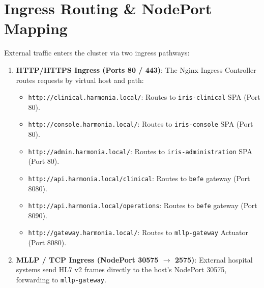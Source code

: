 \section{Ingress Routing \& NodePort Mapping}

External traffic enters the cluster via two ingress pathways:
\begin{enumerate}
    \item \textbf{HTTP/HTTPS Ingress (Ports 80 / 443)}: The Nginx Ingress Controller routes requests by virtual host and path:
    \begin{itemize}
        \item \texttt{http://clinical.harmonia.local/}: Routes to \texttt{iris-clinical} SPA (Port 80).
        \item \texttt{http://console.harmonia.local/}: Routes to \texttt{iris-console} SPA (Port 80).
        \item \texttt{http://admin.harmonia.local/}: Routes to \texttt{iris-administration} SPA (Port 80).
        \item \texttt{http://api.harmonia.local/clinical}: Routes to \texttt{befe} gateway (Port 8080).
        \item \texttt{http://api.harmonia.local/operations}: Routes to \texttt{befe} gateway (Port 8090).
        \item \texttt{http://gateway.harmonia.local/}: Routes to \texttt{mllp-gateway} Actuator (Port 8080).
    \end{itemize}
    \item \textbf{MLLP / TCP Ingress (NodePort 30575 $\rightarrow$ 2575)}: External hospital systems send HL7 v2 frames directly to the host's NodePort 30575, forwarding to \texttt{mllp-gateway}.
\end{enumerate}

\newpage
